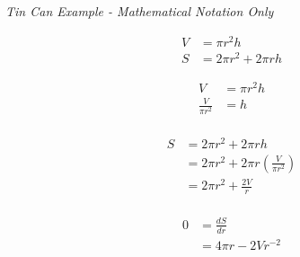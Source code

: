 \documentclass[12pt]{article}
\begin{document}
\begin{center}
\LARGE{\textit{Tin Can Example - Mathematical Notation Only}}
\end{center}

\vspace{15mm}

\begin{minipage}[t]{\textwidth}
\begin{mdframed}[linewidth=0.5mm, backgroundcolor=cyan!10]
\begin{align*}
V &= \pi r^2 h \\
S &= 2\pi r^2 + 2 \pi rh
\end{align*}
\end{mdframed}
\end{minipage}

\vspace{10mm}

\begin{minipage}[t]{\textwidth}
\begin{mdframed}[linewidth=0.5mm, backgroundcolor=cyan!10]
\begin{align*}
V &= \pi r^2 h \\
\frac{V}{\pi r^2} &= h \\
\end{align*}
\end{mdframed}
\end{minipage}

\vspace{10mm}

\begin{minipage}[t]{\textwidth}
\begin{mdframed}[linewidth=0.5mm, backgroundcolor=cyan!10]
\begin{align*}
S &= 2\pi r^2 + 2 \pi rh \\
&= 2\pi r^2 + 2 \pi r\left(\frac{V}{\pi r^2}\right) \\
&= 2\pi r^2 + \frac{2 V}{r} \\
\end{align*}
\end{mdframed}
\end{minipage}

\vspace{10mm}

\begin{minipage}[t]{\textwidth}
\begin{mdframed}[linewidth=0.5mm, backgroundcolor=cyan!10]
\begin{align*}
0 &= \frac{dS}{dr} \\
&= 4\pi r - 2Vr^{-2}
\end{align*}
\end{mdframed}
\end{minipage}
\end{document}
